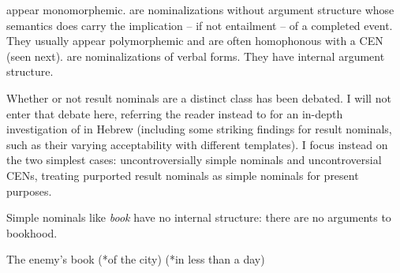 \begin{exe}
\begin{xlist}
\begin{exe}
\begin{xlist}
\begin{exe}
\begin{exe}
\begin{xlist}
\begin{exe}
\begin{exe}
\begin{xlist}
\begin{exe}
\begin{xlist}
\begin{exe}
\begin{xlist}
\begin{exe}
\begin{xlist}
\begin{xlist}
\begin{exe}
\begin{xlist}
\begin{exe}
\begin{xlist}
\begin{exe}
\begin{exe}
\begin{exe}
\begin{xlist}
\begin{exe}
\begin{exe}
\begin{xlist}
\begin{exe}
\begin{xlist}
\begin{exe}
\begin{xlist}
\begin{exe}
\begin{xlist}
\begin{xlist}
\begin{exe}
\begin{xlist}
\begin{exe}
\begin{xlist}
\begin{exe}
\begin{xlist}
\begin{exe}
\begin{xlist}
\begin{exe}
\begin{exe}
\begin{exe}
\begin{exe}
\begin{exe}
\begin{xlist}
\begin{xlist}
\begin{exe}
\begin{xlist}
\begin{exe}
\begin{xlist}
\begin{exe}
\begin{exe}
\begin{exe}
\begin{xlist}
\begin{exe}
\begin{xlist}
\begin{exe}
\begin{xlist}
\begin{exe}
 \begin{exe}
 \ex  \label{ex:5n53}
 \begin{xlist} 
 	\ex  {} appear monomorphemic. 
 	\ex  {} are nominalizations without argument structure whose semantics does carry the implication -- if not entailment -- of a completed event. They usually appear polymorphemic and are often homophonous with a CEN (seen next). 
 	\ex  {} are nominalizations of verbal forms. They have internal argument structure. 
 \z
\z 

Whether or not result nominals are a distinct class has been debated. I will not enter that debate here, referring the reader instead to \cite{ahdout19glow,ahdout19phd} for an in-depth investigation of  in Hebrew (including some striking findings for result nominals, such as their varying acceptability with different templates). I focus instead on the two simplest cases: uncontroversially simple nominals and uncontroversial CENs, treating purported result nominals as simple nominals for present purposes.

Simple nominals like \emph{book }have no internal structure: there are no arguments to bookhood.
 \begin{exe}
\ex  The enemy's book (*of the city) (*in less than a day) 
 \z 	


\end{exe}
\end{xlist}
\end{exe}
\end{exe}
\end{xlist}
\end{exe}
\end{xlist}
\end{exe}
\end{xlist}
\end{exe}
\end{exe}
\end{exe}
\end{xlist}
\end{exe}
\end{xlist}
\end{exe}
\end{xlist}
\end{xlist}
\end{exe}
\end{exe}
\end{exe}
\end{exe}
\end{exe}
\end{xlist}
\end{exe}
\end{xlist}
\end{exe}
\end{xlist}
\end{exe}
\end{xlist}
\end{exe}
\end{xlist}
\end{xlist}
\end{exe}
\end{xlist}
\end{exe}
\end{xlist}
\end{exe}
\end{xlist}
\end{exe}
\end{exe}
\end{xlist}
\end{exe}
\end{exe}
\end{exe}
\end{xlist}
\end{exe}
\end{xlist}
\end{exe}
\end{xlist}
\end{xlist}
\end{exe}
\end{xlist}
\end{exe}
\end{xlist}
\end{exe}
\end{xlist}
\end{exe}
\end{exe}
\end{xlist}
\end{exe}
\end{exe}
\end{xlist}
\end{exe}
\end{xlist}
\end{exe}
